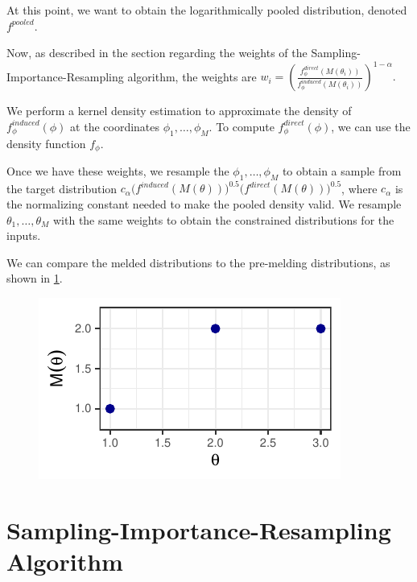 \documentclass[12pt,twoside]{smiththesis}
\begin{document}
At this point, we want to obtain the logarithmically pooled distribution, denoted \(f^{pooled}\).

Now, as described in the section regarding the weights of the Sampling-Importance-Resampling algorithm, the weights are \(w_i = \left( \frac{f_\phi^{direct}(M(\theta_i))}{f_\phi^{induced}(M(\theta_i))} \right)^{1-\alpha}.\)

We perform a kernel density estimation to approximate the density of \(f_\phi^{induced}(\phi)\) at the coordinates \(\phi_1, \dots, \phi_M\). To compute \(f_\phi^{direct}(\phi)\), we can use the density function \(f_\phi\).

Once we have these weights, we resample the \(\phi_1,\dots,\phi_M\) to obtain a sample from the target distribution \(c_\alpha \Big( f^{induced}(M(\theta)) \Big)^{0.5} \Big( f^{direct} (M(\theta)) \Big)^{0.5}\), where \(c_\alpha\) is the normalizing constant needed to make the pooled density valid. We resample \(\theta_1, \dots, \theta_M\) with the same weights to obtain the constrained distributions for the inputs.

We can compare the melded distributions to the pre-melding distributions, as shown in \ref{fig:melded}.
\begin{figure}
\centering
\includegraphics{thesis_files/figure-latex/unnamed-chunk-12-1.pdf}
\caption{\label{fig:unnamed-chunk-12}\label{fig:melded}}
\end{figure}
\newpage

\hypertarget{sampling-importance-resampling-algorithm}{%
\section{Sampling-Importance-Resampling Algorithm}\label{sampling-importance-resampling-algorithm}}
\end{document}
